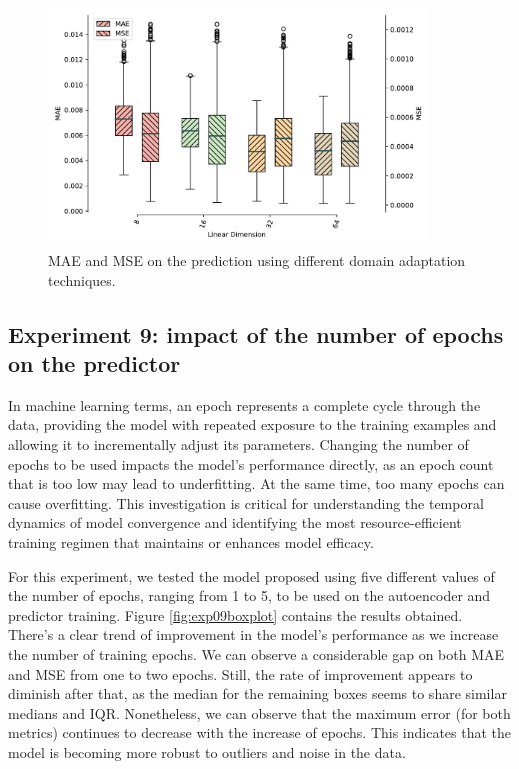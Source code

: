 \begin{figure}[!ht]
\noindent\hspace{0.5mm}\includegraphics[width=0.9\textwidth]{./figures/exp08/boxplot.pdf}
\caption{\gls{MAE} and \gls{MSE} on the prediction using different domain adaptation techniques.}
\label{fig:exp08boxplot}
\end{figure}

\subsection{Experiment 9: impact of the number of epochs on the predictor}

In machine learning terms, an epoch represents a complete cycle through the data, providing the model with repeated exposure to the training examples and allowing it to incrementally adjust its parameters. Changing the number of epochs to be used impacts the model's performance directly, as an epoch count that is too low may lead to underfitting. At the same time, too many epochs can cause overfitting. This investigation is critical for understanding the temporal dynamics of model convergence and identifying the most resource-efficient training regimen that maintains or enhances model efficacy.

For this experiment, we tested the model proposed using five different values of the number of epochs, ranging from 1 to 5, to be used on the autoencoder and predictor training. Figure \ref{fig:exp09boxplot} contains the results obtained. There's a clear trend of improvement in the model's performance as we increase the number of training epochs. We can observe a considerable gap on both \gls{MAE} and \gls{MSE} from one to two epochs. Still, the rate of improvement appears to diminish after that, as the median for the remaining boxes seems to share similar medians and \gls{IQR}. Nonetheless, we can observe that the maximum error (for both metrics) continues to decrease with the increase of epochs. This indicates that the model is becoming more robust to outliers and noise in the data.


